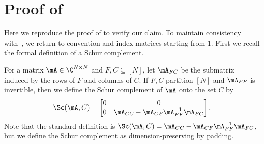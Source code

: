 \documentclass{toc}
\begin{document}
\section{Proof of }\label{sec:app}
Here we reproduce the proof of
%
\cite[Lemma 6.7]{AhmadinejadKeMuPeSiVa19} %
to verify our claim. To maintain consistency with~\cite{AhmadinejadKeMuPeSiVa19}, we return to convention and index matrices starting from $1$.
%
First we  %
recall the formal definition of a Schur complement.

\begin{definition} %
  For a matrix $\mA\in \C^{N\times N}$ and $F,C\subseteq[N]$, let $\mA_{FC}$ be the submatrix induced by the rows of $F$ and columns of $C$. If $F,C$ partition $[N]$ and $\mA_{FF}$ is invertible, then we
%
define  %
the Schur complement of $\mA$ onto the set $C$ by %
%
%
%
%
\[\Sc(\mA,C) = \begin{bmatrix}
0 & 0\\
0 & \mA_{CC}-\mA_{CF}\mA_{FF}^{-1}\mA_{FC}
\end{bmatrix}.\]
Note that the standard definition is $\Sc(\mA,C)=\mA_{CC}-\mA_{CF}\mA_{FF}^{-1}\mA_{FC}$, but we define the Schur complement as dimension-preserving by padding.
%
\end{definition}
\end{document}

